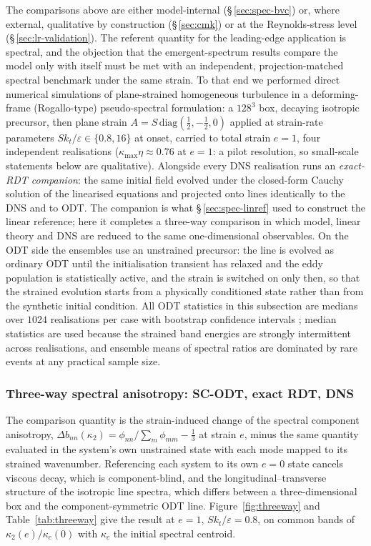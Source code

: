 \documentclass[lineno]{JFM-FLM_Au}
\providecommand{\DIFadd}[1]{{\protect\color{blue}\uwave{#1}}} %
\providecommand{\DIFaddbegin}{} %
\providecommand{\DIFaddend}{} %
\begin{document}
The comparisons above are either model-internal
(\S\,\ref{sec:spec-bvc}) or, where external, qualitative by construction
(\S\,\ref{sec:cmk}) or at the Reynolds-stress level
(\S\,\ref{sec:lr-validation}). The referent quantity for the
leading-edge application is spectral, and the objection that the
emergent-spectrum results compare the model only with itself must be met
with an independent, projection-matched spectral benchmark under the
same strain. To that end
we performed direct numerical simulations of plane-strained homogeneous
turbulence in a deforming-frame (Rogallo-type) pseudo-spectral formulation:
a $128^3$ box, decaying isotropic precursor, then plane strain
$A=S\,\mathrm{diag}(\tfrac12,-\tfrac12,0)$ applied at strain-rate
parameters $Sk_t/\varepsilon\in\{0.8,16\}$ at onset, carried to total
strain $e=1$, four independent realisations
($\kappa_{\max}\eta\approx0.76$ at $e=1$: a pilot resolution, so
small-scale statements below are qualitative). Alongside every DNS
realisation runs an \emph{exact-RDT companion}: the same initial field
evolved under the closed-form Cauchy solution of the linearised equations
and projected onto lines identically to the DNS and to ODT. The companion
is what \S\,\ref{sec:spec-linref} used to construct the linear reference;
here it completes a three-way comparison in which model, linear theory and
DNS are reduced to the same one-dimensional observables. On the ODT side
the ensembles use an unstrained precursor: the line is evolved as ordinary
ODT until the initialisation transient has relaxed and the eddy population
is statistically active, and the strain is switched on only then, so that
the strained evolution starts from a physically conditioned state rather
than from the synthetic initial condition. All ODT statistics in this
subsection are medians over $1024$ realisations per case with bootstrap confidence intervals \DIFaddbegin \DIFadd{(Appendix~\ref{app:numerics})}\DIFaddend ; median statistics are used because the strained band
energies are strongly intermittent across realisations, and ensemble means
of spectral ratios are dominated by rare events at any practical sample
size.

\subsubsection{Three-way spectral anisotropy: SC-ODT, exact RDT,
DNS}\label{sec:threeway}

The comparison quantity is the strain-induced change of the spectral
component anisotropy,
$\Delta b_{nn}(\kappa_2)=\phi_{nn}/\sum_m\phi_{mm}-\tfrac13$ at strain $e$,
minus the same quantity evaluated in the system's own unstrained state with
each mode mapped to its strained wavenumber. Referencing each system to its
own $e=0$ state cancels viscous decay, which is component-blind, and the
longitudinal--transverse structure of the isotropic line spectra, which
differs between a three-dimensional box and the component-symmetric ODT
line. Figure~\ref{fig:threeway} and Table~\ref{tab:threeway} give the
result at $e=1$, $Sk_t/\varepsilon=0.8$, on common bands of
$\kappa_2(e)/\kappa_c(0)$ with $\kappa_c$ the initial spectral centroid.
\end{document}
